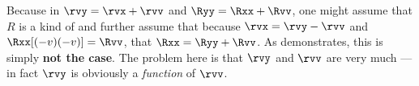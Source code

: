 \begin{remark}
Because in  $\rvy = \rvx + \rvv$ and $\Ryy = \Rxx + \Rvv$,
one might assume that $R$ is a kind of   
and further assume that
because $\rvx=\rvy-\rvv$ and $\Rxx[(-v)(-v)]=\Rvv$, that $\Rxx = \Ryy + \Rvv$.
As  demonstrates, this is simply \textbf{not the case}.
The problem here is that $\rvy$ and $\rvv$ are very much 
---in fact $\rvy$ is obviously a \emph{function} of $\rvv$. %
\end{remark}

